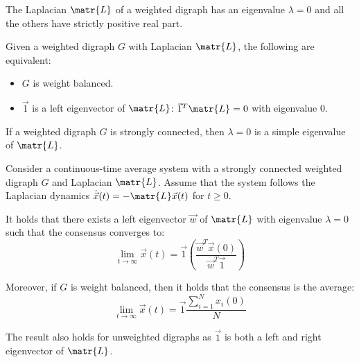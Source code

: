 \begin{lemma} \label{th:weighted_laplacian_eigenvalues}
    The Laplacian $\matr{L}$ of a weighted digraph has an eigenvalue $\lambda=0$ and all the others have strictly positive real part.
\end{lemma}

\begin{lemma}
    Given a weighted digraph $G$ with Laplacian $\matr{L}$, the following are equivalent:
    \begin{itemize}
        \item $G$ is weight balanced.
        \item $\vec{1}$ is a left eigenvector of $\matr{L}$: $\vec{1}^T\matr{L} = 0$ with eigenvalue $0$.
    \end{itemize}
\end{lemma}

\begin{lemma} \label{th:connected_simple_eigenvalue}
    If a weighted digraph $G$ is strongly connected, then $\lambda = 0$ is a simple eigenvalue of $\matr{L}$.
\end{lemma}

\begin{theorem} 
    Consider a continuous-time average system with a strongly connected weighted digraph $G$ and Laplacian $\matr{L}$. Assume that the system follows the Laplacian dynamics $\dot{\vec{x}}(t) = - \matr{L}\vec{x}(t)$ for $t \geq 0$. 
    
    It holds that there exists a left eigenvector $\vec{w}$ of $\matr{L}$ with eigenvalue $\lambda=0$ such that the consensus converges to:
    \[
        \lim_{t \rightarrow \infty} \vec{x}(t) = \vec{1} \left( \frac{\vec{w}^T \vec{x}(0)}{\vec{w}^T \vec{1}} \right)
    \]

    Moreover, if $G$ is weight balanced, then it holds that the consensus is the average:
    \[
        \lim_{t \rightarrow \infty} \vec{x}(t) = \vec{1} \frac{\sum_{i=1}^N x_i(0)}{N}
    \]

        
\end{theorem}

\begin{remark}
    The result also holds for unweighted digraphs as $\vec{1}$ is both a left and right eigenvector of $\matr{L}$.
\end{remark}
